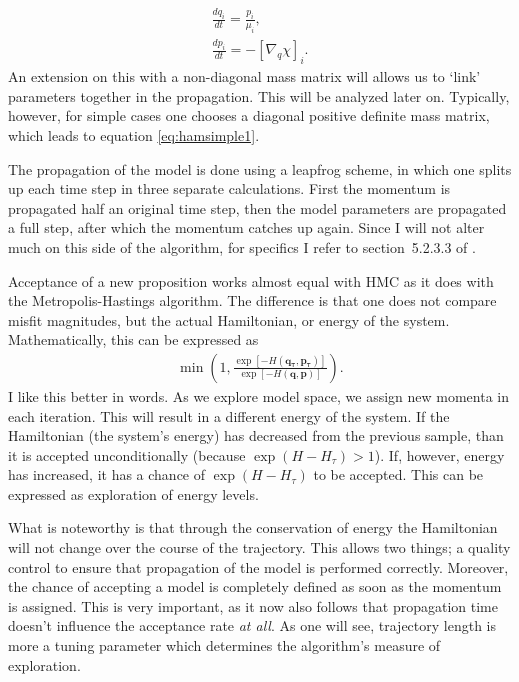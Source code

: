 \begin{gather}
\frac{d q_i}{dt} = \frac{p_i}{\mu_i},\label{eq:hamsimple1}\\
\frac{d p_i}{dt} = - \left[\nabla_{q} \chi \right]_i\label{eq:hamsimple2}.
\end{gather}
An extension on this with a non-diagonal mass matrix will allows us to `link' parameters together in the propagation. This will be analyzed later on. Typically, however, for simple cases one chooses a diagonal positive definite mass matrix, which leads to equation \eqref{eq:hamsimple1}.

The propagation of the model is done using a leapfrog scheme, in which one splits up each time step in three separate calculations. First the momentum is propagated half an original time step, then the model parameters are propagated a full step, after which the momentum catches up again. Since I will not alter much on this side of the algorithm, for specifics I refer to section~5.2.3.3 of \cite{neal2011mcmc}.

Acceptance of a new proposition works almost equal with \gls{HMC} as it does with the Metropolis-Hastings algorithm. The difference is that one does not compare misfit magnitudes, but the actual Hamiltonian, or energy of the system. Mathematically, this can be expressed as
\begin{gather}
	\min\left( 1, \frac{\exp\left[-H(\mathbf{q_\tau},\mathbf{p_\tau}) \right]}{\exp\left[-H(\mathbf{q},\mathbf{p}) \right]} \right).
\end{gather}
I like this better in words. As we explore model space, we assign new momenta in each iteration. This will result in a different energy of the system. If the Hamiltonian (the system's energy) has decreased from the previous sample, than it is accepted unconditionally (because $\exp (H - H_\tau)>1$). If, however, energy has increased, it has a chance of $\exp \left(H - H_\tau\right)$ to be accepted. This can be expressed as exploration of energy levels.

What is noteworthy is that through the conservation of energy the Hamiltonian will not change over the course of the trajectory. This allows two things; a quality control to ensure that propagation of the model is performed correctly. Moreover, the chance of accepting a model is completely defined as soon as the momentum is assigned. This is very important, as it now also follows that propagation time doesn't influence the acceptance rate \textit{at all}. As one will see, trajectory length is more a tuning parameter which determines the algorithm's measure of exploration.

